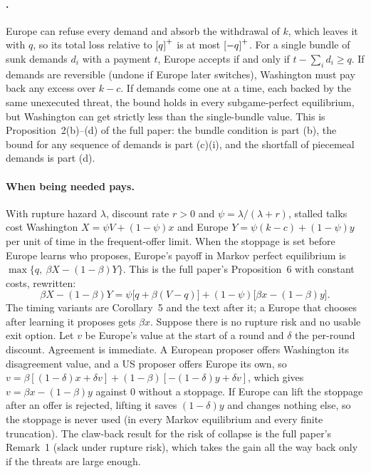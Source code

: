 \documentclass[11pt]{article}
\begin{document}
\paragraph{.} Europe can refuse every demand and absorb the withdrawal of $k$, which leaves it with $q$, so its total loss relative to $\left[q\right]^{+}$ is at most $\left[-q\right]^{+}$. For a single bundle of sunk demands $d_i$ with a payment $t$, Europe accepts if and only if $t-\sum_i d_i\ge q$. If demands are reversible (undone if Europe later switches), Washington must pay back any excess over $k-c$. If demands come one at a time, each backed by the same unexecuted threat, the bound holds in every subgame-perfect equilibrium, but Washington can get strictly less than the single-bundle value. This is Proposition~2(b)--(d) of the full paper: the bundle condition is part (b), the bound for any sequence of demands is part (c)(i), and the shortfall of piecemeal demands is part (d).

\paragraph{When being needed pays.} With rupture hazard $\lambda$, discount rate $r>0$ and $\psi=\lambda/(\lambda+r)$, stalled talks cost Washington $X=\psi V+(1-\psi)x$ and Europe $Y=\psi(k-c)+(1-\psi)y$ per unit of time in the frequent-offer limit. When the stoppage is set before Europe learns who proposes, Europe's payoff in Markov perfect equilibrium is $\max\{q,\ \beta X-(1-\beta)Y\}$. This is the full paper's Proposition~6 with constant costs, rewritten:
\[
\beta X-(1-\beta)Y=\psi\big[q+\beta(V-q)\big]+(1-\psi)\big[\beta x-(1-\beta)y\big].
\]
The timing variants are Corollary~5 and the text after it; a Europe that chooses after learning it proposes gets $\beta x$. Suppose there is no rupture risk and no usable exit option. Let $v$ be Europe's value at the start of a round and $\delta$ the per-round discount. Agreement is immediate. A European proposer offers Washington its disagreement value, and a US proposer offers Europe its own, so $v=\beta[(1-\delta)x+\delta v]+(1-\beta)[-(1-\delta)y+\delta v]$, which gives $v=\beta x-(1-\beta)y$ against $0$ without a stoppage. If Europe can lift the stoppage after an offer is rejected, lifting it saves $(1-\delta)y$ and changes nothing else, so the stoppage is never used (in every Markov equilibrium and every finite truncation). The claw-back result for the risk of collapse is the full paper's Remark~1 (slack under rupture risk), which takes the gain all the way back only if the threats are large enough.
\end{document}
